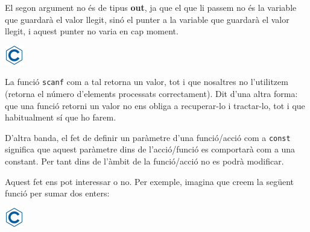 \documentclass[]{book}
\newenvironment{Shaded}{\begin{snugshade}}{\end{snugshade}}
\newcommand{\DataTypeTok}[1]{\textcolor[rgb]{0.13,0.29,0.53}{#1}}
\newcommand{\DecValTok}[1]{\textcolor[rgb]{0.00,0.00,0.81}{#1}}
\newcommand{\SpecialCharTok}[1]{\textcolor[rgb]{0.00,0.00,0.00}{#1}}
\newcommand{\StringTok}[1]{\textcolor[rgb]{0.31,0.60,0.02}{#1}}
\newcommand{\ImportTok}[1]{#1}
\newcommand{\CommentTok}[1]{\textcolor[rgb]{0.56,0.35,0.01}{\textit{#1}}}
\newcommand{\ControlFlowTok}[1]{\textcolor[rgb]{0.13,0.29,0.53}{\textbf{#1}}}
\newcommand{\PreprocessorTok}[1]{\textcolor[rgb]{0.56,0.35,0.01}{\textit{#1}}}
\newcommand{\NormalTok}[1]{#1}
\begin{document}
El segon argument no és de tipus \textbf{out}, ja que el que li passem
no és la variable que guardarà el valor llegit, sinó el punter a la
variable que guardarà el valor llegit, i aquest punter no varia en cap
moment.

\includegraphics{./img/c.png}

\begin{Shaded}
\end{Shaded}

La funció \texttt{scanf} com a tal retorna un valor, tot i que nosaltres
no l'utilitzem (retorna el número d'elements processats correctament).
Dit d'una altra forma: que una funció retorni un valor no ens obliga a
recuperar-lo i tractar-lo, tot i que habitualment sí que ho farem.

D'altra banda, el fet de definir un paràmetre d'una funció/acció com a
\texttt{const} significa que aquest paràmetre dins de l'acció/funció es
comportarà com a una constant. Per tant dins de l'àmbit de la
funció/acció no es podrà modificar.

Aquest fet ens pot interessar o no. Per exemple, imagina que creem la
següent funció per sumar dos enters:

\includegraphics{./img/c.png}

\begin{Shaded}
\end{Shaded}
\end{document}
